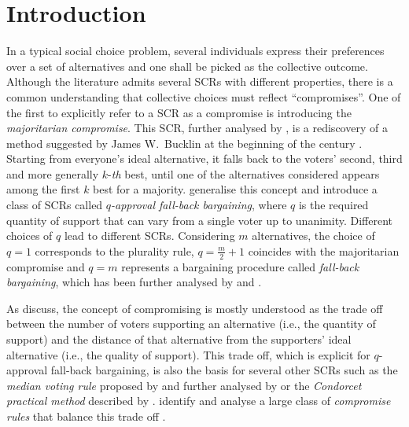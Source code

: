 \documentclass[version=3.21, pagesize, twoside=off, bibliography=totoc, DIV=calc, fontsize=12pt, a4paper]{scrartcl}
\begin{document}
\section{Introduction}
\label{sec:introduction}
In a typical social choice problem, several individuals express their preferences over a set of alternatives and one shall be picked as the collective outcome. Although the literature admits several \acp{SCR} with different properties, there is a common understanding that collective choices must reflect “compromises”. One of the first to explicitly refer to a \ac{SCR} as a compromise is \citet{Sertel1986} introducing the \emph{majoritarian compromise}. This \ac{SCR}, further analysed by \citet{Sertel1999}, is a rediscovery of a method suggested by James W.\ Bucklin at the beginning of the  century \citep{Erdelyi2015}. Starting from everyone’s ideal alternative, it falls back to the voters’ second, third and more generally $k$-\emph{th} best, until one of the alternatives considered appears among the first $k$ best for a majority. \citet{Brams2001} generalise this concept and introduce a class of \acp{SCR} called $q$\emph{-approval fall-back bargaining}, where $q$ is the required quantity of support that can vary from a single voter up to unanimity. Different choices of $q$ lead to different \acp{SCR}. Considering $m$ alternatives, the choice of $q=1$ corresponds to the plurality rule, $q=\frac{m}{2}+1$ coincides with the majoritarian compromise and $q=m$ represents a bargaining procedure called \emph{fall-back bargaining}, which has been further analysed by \citet{Kibris2007} and \citet{Congar2012}. 

As \citet{OezkalSanver2004} discuss, the concept of compromising is mostly understood as the trade off between the number of voters supporting an alternative (i.e., the quantity of support) and the distance of that alternative from the supporters’ ideal alternative (i.e., the quality of support). This trade off, which is explicit for $q$-approval fall-back bargaining, is also the basis for several other \acp{SCR} such as the \emph{median voting rule} proposed by \citet{Bassett1999} and further analysed by \citet{Gehrlein2003} or the \emph{Condorcet practical method }described by \citet{Nurmi1999}. \citet{Merlin2019} identify and analyse a large class of \emph{compromise rules} that balance this trade off . 
\end{document}
